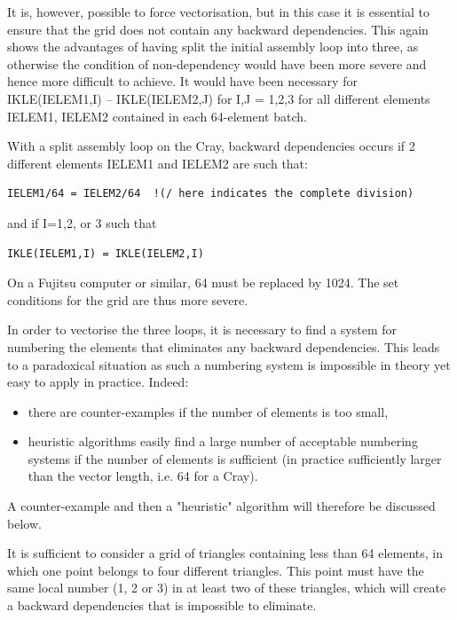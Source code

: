 It is, however, possible to force vectorisation, but in this case it is
essential to ensure that the grid does not contain any backward dependencies.
This again shows the advantages of having split the initial assembly loop into
three, as otherwise the condition of non-dependency would have been more severe
and hence more difficult to achieve. It would have been necessary for
IKLE(IELEM1,I) -- IKLE(IELEM2,J) for I,J = 1,2,3 for all different elements
IELEM1, IELEM2 contained in each 64-element batch.

With a split assembly loop on the Cray, backward dependencies occurs if 2
different elements IELEM1 and IELEM2 are such that:

\begin{lstlisting}[language=TelFortran]
IELEM1/64 = IELEM2/64  !(/ here indicates the complete division)
\end{lstlisting}

and if I=1,2, or 3 such that

\begin{lstlisting}[language=TelFortran]
IKLE(IELEM1,I) = IKLE(IELEM2,I)
\end{lstlisting}

On a Fujitsu computer or similar, 64 must be replaced by 1024. The set
conditions for the grid are thus more severe.

In order to vectorise the three loops, it is necessary to find a system for
numbering the elements that eliminates any backward dependencies. This leads to
a paradoxical situation as such a numbering system is impossible in theory yet
easy to apply in practice. Indeed:
\begin{itemize}
  \item there are counter-examples if the number of elements is too small,
  \item heuristic algorithms easily find a large number of acceptable numbering
    systems if the number of elements is sufficient (in practice sufficiently
    larger than the vector length, i.e. 64 for a Cray).
\end{itemize}

A counter-example and then a "heuristic" algorithm will therefore be discussed
below.


It is sufficient to consider a grid of triangles containing less than 64
elements, in which one point belongs to four different triangles. This point
must have the same local number (1, 2 or 3) in at least two of these triangles,
which will create a backward dependencies that is impossible to eliminate.

